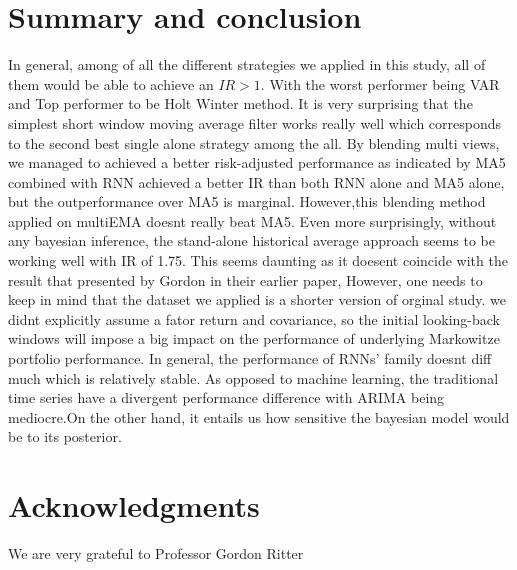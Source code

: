 \documentclass[12pt]{article}
\numberwithin{equation}{section}
\begin{document}
\section{Summary and conclusion}
In general, among of all the different strategies we applied in this study, all of them would be able to achieve an $IR>1$. With the worst performer being VAR and Top performer to be Holt Winter method. It is very surprising that the simplest short window moving average filter works really well which corresponds to the second best single alone strategy among the all. By blending multi views, we managed to achieved a better risk-adjusted performance as indicated by MA5 combined with RNN achieved a better IR than both RNN alone and MA5 alone, but the outperformance over MA5 is marginal. However,this blending method applied on multiEMA doesnt really beat MA5. Even more surprisingly, without any bayesian inference, the stand-alone historical average approach seems to be working well with IR of 1.75. This seems daunting as it doesent coincide with the result that presented by Gordon in their earlier paper, However, one needs to keep in mind that the dataset we applied is a shorter version of orginal study. we didnt explicitly assume a fator return and covariance, so the initial looking-back windows will impose a big impact on the performance of underlying Markowitze portfolio performance. In general, the performance of RNNs' family doesnt diff much which is relatively stable. As opposed to machine learning, the traditional time series have a divergent performance difference with ARIMA being mediocre.On the other hand, it entails us how sensitive the bayesian model would be to its posterior.

\section*{Acknowledgments}

We are very grateful to Professor Gordon Ritter

%
%
%
%
\end{document}
